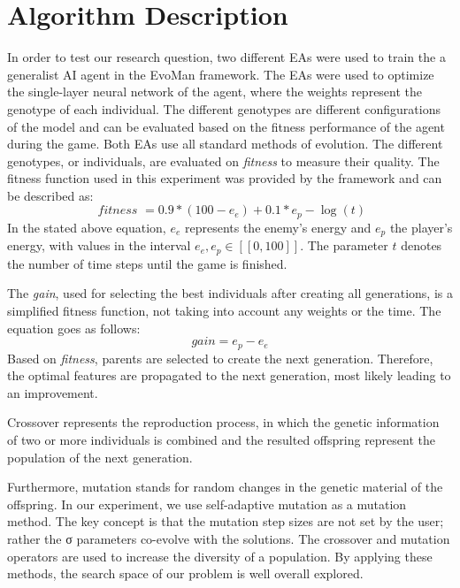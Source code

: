 \section{Algorithm Description}

In order to test our research question, two different EAs were used to train the a generalist AI agent in the EvoMan framework. The EAs were used to optimize the single-layer neural network of the agent, where the weights represent the genotype of each individual. The different genotypes are different configurations of the model and can be evaluated based on the fitness performance of the agent during the game. Both EAs use all standard methods of evolution. The different genotypes, or individuals, are evaluated on \emph{fitness} to measure their quality. The fitness function used in this experiment was provided by the framework and can be described as: 
\begin{equation}
\label{fitness}
\textit { fitness }=0.9 *\left(100-e_{e}\right)+0.1 * e_{p}-\log(t)
\end{equation}
In the stated above equation, $e_e$ represents the enemy's energy and $e_p$ the player's energy, with values in the interval $e_e, e_p \in [[0, 100]]$. The parameter $t$ denotes the number of time steps until the game is finished.

The \emph{gain}, used for selecting the best individuals after creating all generations, is a simplified fitness function, not taking into account any weights or the time. The equation goes as follows:
\begin{equation}
\label{gain}
    \textit{gain} = e_p - e_e
\end{equation}
Based on \emph{fitness}, parents are selected to create the next generation. Therefore, the optimal features are propagated to the next generation, most likely leading to an improvement.

Crossover represents the reproduction process, in which the genetic information of two or more individuals is combined and the resulted offspring represent the population of the next generation.

Furthermore, mutation stands for random changes in the genetic material of the offspring. In our experiment, we use self-adaptive mutation as a mutation method. The key concept is that the mutation step sizes are not set by the user; rather the σ parameters co-evolve with the solutions. The crossover and mutation operators are used to increase the diversity of a population. By applying these methods, the search space of our problem is well overall explored. 

